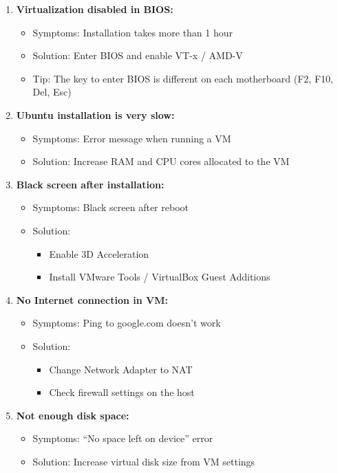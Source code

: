 \begin{enumerate}

    \item \textbf{Virtualization disabled in BIOS:}
    \begin{itemize}
        \item Symptoms: Installation takes more than 1 hour
        \item Solution: Enter BIOS and enable VT-x / AMD-V
        \item Tip: The key to enter BIOS is different on each motherboard (F2, F10, Del, Esc)
    \end{itemize}

    \item \textbf{Ubuntu installation is very slow:}
    \begin{itemize}
        \item Symptoms: Error message when running a VM
        \item Solution: Increase RAM and CPU cores allocated to the VM
    \end{itemize}

    \item \textbf{Black screen after installation:}
    \begin{itemize}
        \item Symptoms: Black screen after reboot
        \item Solution:
        \begin{itemize}
            \item Enable 3D Acceleration
            \item Install VMware Tools / VirtualBox Guest Additions
        \end{itemize}
    \end{itemize}

    \item \textbf{No Internet connection in VM:}
    \begin{itemize}
        \item Symptoms: Ping to google.com doesn’t work
        \item Solution:
        \begin{itemize}
            \item Change Network Adapter to NAT
            \item Check firewall settings on the host
        \end{itemize}
    \end{itemize}

    \item \textbf{Not enough disk space:}
    \begin{itemize}
        \item Symptoms: “No space left on device” error
        \item Solution: Increase virtual disk size from VM settings
    \end{itemize}

\end{enumerate}

